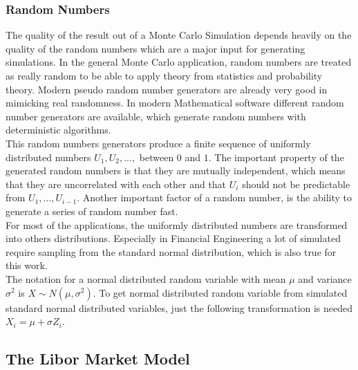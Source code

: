 \documentclass[11pt]{article}
\numberwithin{equation}{subsection}
\begin{document}
\subsubsection{Random Numbers}		
The quality of the result out of a Monte Carlo Simulation depends heavily on the quality of the random numbers which are a major input for generating simulations. In the general Monte Carlo application, random numbers are treated as really random to be able to apply theory from statistics and probability theory. Modern pseudo random number generators are already very good in mimicking real randomness. In modern Mathematical software different random number generators are available, which generate random numbers with deterministic algorithms.\\
This random numbers generators produce a finite sequence of uniformly distributed numbers \(U_1, U_2,...,\) between \(0\) and \(1\). The important property of the generated random numbers is that they are mutually independent, which means that they are uncorrelated with each other and that \(U_i\) should not be predictable from \(U_1,...,U_{i-1}\). Another important factor of a random number, is the ability to generate a series of random number fast.\\
For most of the applications, the uniformly distributed numbers are transformed into others distributions. Especially in Financial Engineering a lot of simulated require sampling from the standard normal distribution, which is also true for this work.\\
The notation for a normal distributed random variable with mean \(\mu\) and variance \(\sigma^2\) is \(X \sim N(\mu, \sigma^2)\). To get normal distributed random variable from simulated standard normal distributed variables, just the following transformation is needed
\(X_i = \mu + \sigma Z_i\).


\subsection{The Libor Market Model}
\end{document}
